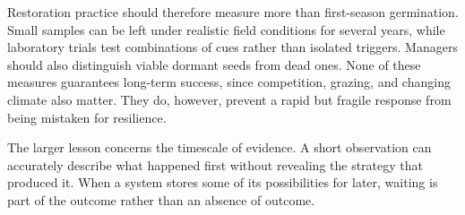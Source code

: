 Restoration practice should therefore measure more than first-season germination. Small samples can be left under realistic field conditions for several years, while laboratory trials test combinations of cues rather than isolated triggers. Managers should also distinguish viable dormant seeds from dead ones. None of these measures guarantees long-term success, since competition, grazing, and changing climate also matter. They do, however, prevent a rapid but fragile response from being mistaken for resilience.

The larger lesson concerns the timescale of evidence. A short observation can accurately describe what happened first without revealing the strategy that produced it. When a system stores some of its possibilities for later, waiting is part of the outcome rather than an absence of outcome.

